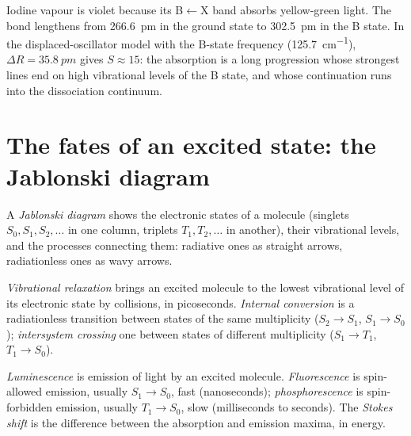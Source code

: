 \begin{example}[Iodine]\label{ex:b3:electronic-spectroscopy:iodine}
Iodine vapour is violet because its B$\leftarrow$X band absorbs yellow-green light.
The bond lengthens from \qty{266.6}{pm} in the ground state to \qty{302.5}{pm} in
the B state. In the displaced-oscillator model with the B-state frequency
(\qty{125.7}{cm^{-1}}), $\Delta R = \qty{35.8}{pm}$ gives $S \approx 15$: the absorption is a
long progression whose strongest lines end on high vibrational levels of the
B state, and whose continuation runs into the dissociation continuum.
\end{example}

\section{The fates of an excited state: the Jablonski diagram}

\begin{definition}\label{def:b3:electronic-spectroscopy:jablonski}
A \emph{Jablonski diagram} shows the electronic states
of a molecule (singlets $S_0, S_1, S_2, \dots$ in one column, triplets $T_1, T_2,
\dots$ in another), their vibrational levels, and the processes connecting them:
radiative ones as straight arrows, radiationless ones as wavy arrows.
\end{definition}

\begin{definition}\label{def:b3:electronic-spectroscopy:radiationless}
\emph{Vibrational relaxation} brings an excited
molecule to the lowest vibrational level of its electronic state by
collisions, in picoseconds. \emph{Internal conversion}
is a radiationless transition between states of the same
multiplicity ($S_2 \to S_1$, $S_1 \to S_0$); \emph{intersystem
crossing} one between states of different
multiplicity ($S_1 \to T_1$, $T_1 \to S_0$).
\end{definition}

\begin{definition}\label{def:b3:electronic-spectroscopy:luminescence}
\emph{Luminescence} is emission of light by an excited
molecule. \emph{Fluorescence} is spin-allowed emission,
usually $S_1 \to S_0$, fast (nanoseconds); \emph{phosphorescence}
is spin-forbidden emission, usually $T_1 \to S_0$, slow (milliseconds to
seconds). The \emph{Stokes shift} is the difference between
the absorption and emission maxima, in energy.
\end{definition}

